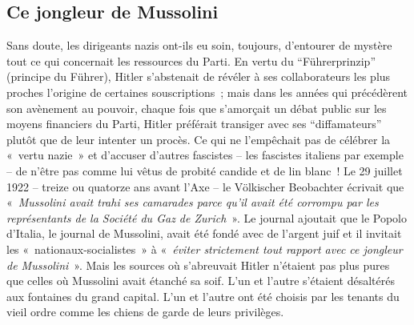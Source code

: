 \documentclass[french,twoside]{book} %
\begin{document}
\subsection[Ce jongleur de Mussolini]{Ce jongleur de Mussolini}
\noindent Sans doute, les dirigeants nazis ont-ils eu soin, toujours, d’entourer de mystère tout ce qui concernait les ressources du Parti. En vertu du “Führerprinzip” (principe du Führer), Hitler s’abstenait de révéler à ses collaborateurs les plus proches l’origine de certaines souscriptions ; mais dans les années qui précédèrent son avènement au pouvoir, chaque fois que s’amorçait un débat public sur les moyens financiers du Parti, Hitler préférait transiger avec ses “diffamateurs” plutôt que de leur intenter un procès. Ce qui ne l’empêchait pas de célébrer la « vertu nazie » et d’accuser d’autres fascistes – les fascistes italiens par exemple – de n’être pas comme lui vêtus de probité candide et de lin blanc ! Le 29 juillet 1922 – treize ou quatorze ans avant l’Axe – le Völkischer Beobachter écrivait que « \emph{Mussolini avait trahi ses camarades parce qu’il avait été corrompu par les représentants de la Société du Gaz de Zurich} ». Le journal ajoutait que le Popolo d’Italia, le journal de Mussolini, avait été fondé avec de l’argent juif et il invitait les « nationaux-socialistes » à « \emph{éviter strictement tout rapport avec ce jongleur de Mussolini} ». Mais les sources où s’abreuvait Hitler n’étaient pas plus pures que celles où Mussolini avait étanché sa soif. L’un et l’autre s’étaient désaltérés aux fontaines du grand capital. L’un et l’autre ont été choisis par les tenants du vieil ordre comme les chiens de garde de leurs privilèges.
\end{document}

